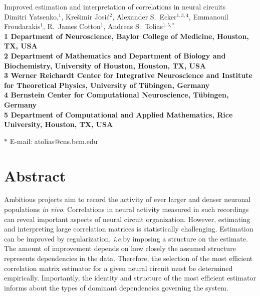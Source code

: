 \documentclass[10pt]{article}
\date{}
\newcommand{\ie}{\emph{i.e.}\;}
\begin{document}
\begin{flushleft}
{\Large
Improved estimation and interpretation of correlations in neural circuits
}
\\
Dimitri Yatsenko,$^{1}$, 
Kre\v{s}imir Josi\'{c}$^{2}$,
Alexander S.~Ecker$^{1,3,4}$,
Emmanouil Froudarakis$^{1}$,
R.~James Cotton$^{1}$,
Andreas S.~Tolias$^{1,5,\ast}$
\\
\bf{1} Department of Neuroscience, Baylor College of Medicine, Houston, TX, USA
\\
\bf{2} Department of Mathematics and Department of Biology and Biochemistry, University of Houston, Houston, TX, USA
\\
\bf{3}  Werner Reichardt Center for Integrative Neuroscience and Institute for Theoretical Physics, University of T\"ubingen, Germany
\\
\bf{4} Bernstein Center for Computational Neuroscience, T\"ubingen, Germany
\\
\bf{5} Department of Computational and Applied Mathematics, Rice University, Houston, TX, USA

$\ast$ E-mail: atolias@cns.bcm.edu
\end{flushleft}

\section*{Abstract}
Ambitious projects aim to record the activity of ever larger and denser neuronal populations \emph{in vivo}.  Correlations in neural activity measured in such recordings can reveal important aspects of  neural circuit organization.  However, estimating and interpreting large correlation matrices is statistically challenging.  Estimation can be improved by regularization, \ie by imposing a structure on the estimate.  The amount of improvement depends on how closely the assumed structure represents dependencies in the data. Therefore, the selection of the most efficient correlation matrix estimator for a given neural circuit must be determined empirically.  Importantly, the identity and structure of the most efficient estimator informs about the types of dominant dependencies governing the system.
\end{document}
